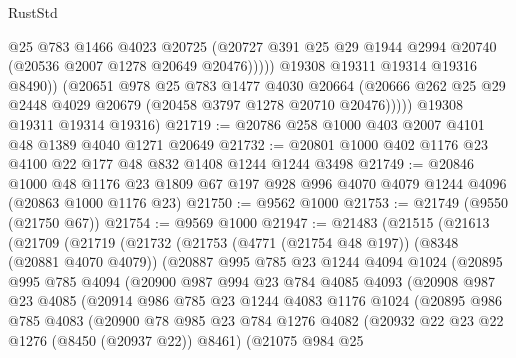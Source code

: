 \begin{lexlean}{RustStd}
\begin{coremodule}
                    @25
                    @783
                    @1466
                    @4023
                    @20725
                    (@20727 @391 @25 @29 @1944 @2994 @20740 (@20536 @2007 @1278 @20649 @20476)))))
              @19308
              @19311
              @19314
              @19316
              @8490))
          (@20651
            @978
            @25
            @783
            @1477
            @4030
            @20664
            (@20666 @262 @25 @29 @2448 @4029 @20679 (@20458 @3797 @1278 @20710 @20476)))))
      @19308
      @19311
      @19314
      @19316)
@21719 := @20786 @258 @1000 @403 @2007 @4101 @48 @1389 @4040 @1271 @20649
@21732 := @20801 @1000 @402 @1176 @23 @4100 @22 @177 @48 @832 @1408 @1244 @1244 @3498
@21749 := @20846
    @1000
    @48
    @1176
    @23
    @1809
    @67
    @197
    @928
    @996
    @4070
    @4079
    @1244
    @4096
    (@20863 @1000 @1176 @23)
@21750 := @9562 @1000
@21753 := @21749 (@9550 (@21750 @67))
@21754 := @9569 @1000
@21947 := @21483
    (@21515
      (@21613
        (@21709
          (@21719
            (@21732
              (@21753
                (@4771 (@21754 @48 @197))
                (@8348 (@20881 @4070 @4079))
                (@20887
                  @995
                  @785
                  @23
                  @1244
                  @4094
                  @1024
                  (@20895
                    @995
                    @785
                    @4094
                    (@20900
                      @987
                      @994
                      @23
                      @784
                      @4085
                      @4093
                      (@20908
                        @987
                        @23
                        @4085
                        (@20914
                          @986
                          @785
                          @23
                          @1244
                          @4083
                          @1176
                          @1024
                          (@20895
                            @986
                            @785
                            @4083
                            (@20900
                              @78
                              @985
                              @23
                              @784
                              @1276
                              @4082
                              (@20932 @22 @23 @22 @1276 (@8450 (@20937 @22)) @8461)
                              (@21075
                                @984
                                @25

\end{coremodule}
\end{lexlean}
